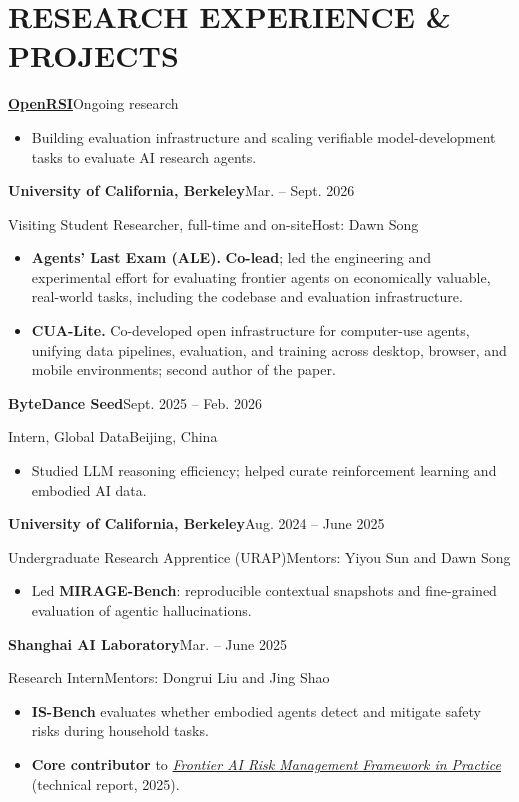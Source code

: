 \documentclass[10pt,letterpaper]{article}
\newcommand{\entry}[4]{%
  \textbf{#1}\hfill{\small #2}\par
  {\small #3\hfill\textcolor{muted}{#4}}\par}
\begin{document}
\section{RESEARCH EXPERIENCE \& PROJECTS}
\textbf{\href{https://openrsi.foundation/}{OpenRSI}}\hfill{\small Ongoing research}\par
\begin{itemize}
  \item Building evaluation infrastructure and scaling verifiable model-development tasks to evaluate AI research agents.
\end{itemize}
\vspace{4pt}
\entry{University of California, Berkeley}{Mar. -- Sept. 2026}
  {Visiting Student Researcher, full-time and on-site}{Host: Dawn Song}
\begin{itemize}
  \item \textbf{Agents' Last Exam (ALE).} \textbf{Co-lead}; led the engineering and experimental effort for evaluating frontier agents on economically valuable, real-world tasks, including the codebase and evaluation infrastructure.
  \item \textbf{CUA-Lite.} Co-developed open infrastructure for computer-use agents, unifying data pipelines, evaluation, and training across desktop, browser, and mobile environments; second author of the paper.
\end{itemize}
\vspace{4pt}
\entry{ByteDance Seed}{Sept. 2025 -- Feb. 2026}
  {Intern, Global Data}{Beijing, China}
\begin{itemize}
  \item Studied LLM reasoning efficiency; helped curate reinforcement learning and embodied AI data.
\end{itemize}
\vspace{4pt}
\entry{University of California, Berkeley}{Aug. 2024 -- June 2025}
  {Undergraduate Research Apprentice (URAP)}{Mentors: Yiyou Sun and Dawn Song}
\begin{itemize}
  \item Led \textbf{MIRAGE-Bench}: reproducible contextual snapshots and fine-grained evaluation of agentic hallucinations.
\end{itemize}
\vspace{4pt}
\entry{Shanghai AI Laboratory}{Mar. -- June 2025}
  {Research Intern}{Mentors: Dongrui Liu and Jing Shao}
\begin{itemize}
  \item \textbf{IS-Bench} evaluates whether embodied agents detect and mitigate safety risks during household tasks.
  \item \textbf{Core contributor} to \href{https://arxiv.org/abs/2507.16534}{\textit{Frontier AI Risk Management Framework in Practice}} (technical report, 2025).
\end{itemize}
\end{document}
